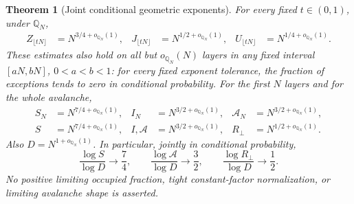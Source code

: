 \documentclass[11pt]{article}
\numberwithin{equation}{section}
\newtheorem{theorem}{Theorem}[section]
\theoremstyle{definition}
\begin{document}
\begin{theorem}[Joint conditional geometric exponents]\label{thm:conditional-geometry}
For every fixed $t\in(0,1)$, under $\mathbb Q_N$,
\begin{align}
 Z_{\lfloor tN\rfloor}&=N^{3/4+o_{\mathbb Q_N}(1)},&
 J_{\lfloor tN\rfloor}&=N^{1/2+o_{\mathbb Q_N}(1)},&
 U_{\lfloor tN\rfloor}&=N^{1/4+o_{\mathbb Q_N}(1)}.\label{eq:conditional-layer-geometry}
\end{align}
These estimates also hold on all but $o_{\mathbb Q_N}(N)$ layers in any fixed interval $[aN,bN]$, $0<a<b<1$: for every fixed exponent tolerance, the fraction of exceptions tends to zero in conditional probability. For the first $N$ layers and for the whole avalanche,
\begin{align}
 S_N&=N^{7/4+o_{\mathbb Q_N}(1)},&
 I_N&=N^{3/2+o_{\mathbb Q_N}(1)},&
 \mathcal A_N&=N^{3/2+o_{\mathbb Q_N}(1)},\label{eq:conditional-prefix-geometry}\\
 S&=N^{7/4+o_{\mathbb Q_N}(1)},&
 I,\mathcal A&=N^{3/2+o_{\mathbb Q_N}(1)},&
 R_\perp&=N^{1/2+o_{\mathbb Q_N}(1)}.\label{eq:conditional-full-geometry}
\end{align}
Also $D=N^{1+o_{\mathbb Q_N}(1)}$. In particular, jointly in conditional probability,
\begin{equation}\label{eq:conditional-joint-ratios}
 \frac{\log S}{\log D}\longrightarrow\frac74,\qquad
 \frac{\log\mathcal A}{\log D}\longrightarrow\frac32,\qquad
 \frac{\log R_\perp}{\log D}\longrightarrow\frac12.
\end{equation}
No positive limiting occupied fraction, tight constant-factor normalization, or limiting avalanche shape is asserted.
\end{theorem}
\end{document}
